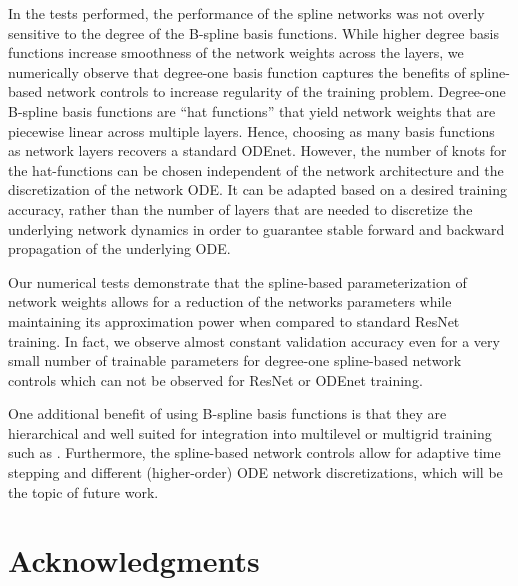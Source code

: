 \documentclass[12pt]{amsart}
\begin{document}
In the tests performed, the performance of the spline networks was not overly sensitive to the degree of the B-spline basis functions.
While higher degree basis functions increase smoothness of the network weights across the layers, we numerically observe that degree-one basis function  captures the benefits of spline-based network controls to increase regularity of the training problem.
Degree-one B-spline basis functions are ``hat functions'' that yield network weights that are piecewise linear across multiple layers. Hence, choosing as many basis functions as network layers recovers a standard ODEnet.
However, the number of knots for the hat-functions can be chosen independent of the network architecture and the discretization of the network ODE.
It can be adapted based on a desired training accuracy, rather than the number of layers that are needed to discretize the underlying network dynamics in order to guarantee stable forward and backward propagation of the underlying ODE.

Our numerical tests demonstrate that the spline-based parameterization of network weights allows for a reduction of the networks parameters while maintaining its approximation power when compared to standard ResNet training.
In fact, we observe almost constant validation accuracy even for a very small number of trainable parameters for degree-one spline-based network controls which can not be observed for ResNet or ODEnet training.

One additional benefit of using B-spline basis functions is that they are hierarchical and well suited for integration into multilevel or multigrid training such as \cite{gaedke2020multilevel, gunther2020layer}. Furthermore, the spline-based network controls allow for adaptive time stepping and different (higher-order) ODE network discretizations, which will be the topic of future work.

\section*{Acknowledgments}
\end{document}
